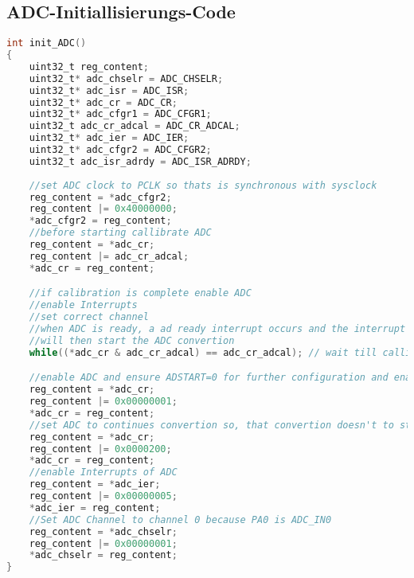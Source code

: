     \subsection{ADC-Initiallisierungs-Code}
        \begin{lstlisting}[language=C, style=CStyle, caption=ADC-Initiallisierungs-Code, captionpos=b, label=ADC-Initiallisierungs-Code]
int init_ADC()
{   
    uint32_t reg_content;
    uint32_t* adc_chselr = ADC_CHSELR;
    uint32_t* adc_isr = ADC_ISR;       
    uint32_t* adc_cr = ADC_CR;
    uint32_t* adc_cfgr1 = ADC_CFGR1;
    uint32_t adc_cr_adcal = ADC_CR_ADCAL;
    uint32_t* adc_ier = ADC_IER;
    uint32_t* adc_cfgr2 = ADC_CFGR2;
    uint32_t adc_isr_adrdy = ADC_ISR_ADRDY;
    
    //set ADC clock to PCLK so thats is synchronous with sysclock
    reg_content = *adc_cfgr2;
    reg_content |= 0x40000000;
    *adc_cfgr2 = reg_content;
    //before starting callibrate ADC
    reg_content = *adc_cr;
    reg_content |= adc_cr_adcal;
    *adc_cr = reg_content;

    //if calibration is complete enable ADC
    //enable Interrupts
    //set correct channel
    //when ADC is ready, a ad ready interrupt occurs and the interrupt handler
    //will then start the ADC convertion
    while((*adc_cr & adc_cr_adcal) == adc_cr_adcal); // wait till callibration is complete

    //enable ADC and ensure ADSTART=0 for further configuration and enable ADC
    reg_content = *adc_cr;
    reg_content |= 0x00000001;
    *adc_cr = reg_content;
    //set ADC to continues convertion so, that convertion doesn't to start again in Interrupt
    reg_content = *adc_cr;
    reg_content |= 0x0000200;
    *adc_cr = reg_content;
    //enable Interrupts of ADC
    reg_content = *adc_ier;
    reg_content |= 0x00000005;
    *adc_ier = reg_content;
    //Set ADC Channel to channel 0 because PA0 is ADC_IN0
    reg_content = *adc_chselr;
    reg_content |= 0x00000001;
    *adc_chselr = reg_content;
}
        \end{lstlisting}
\newpage
